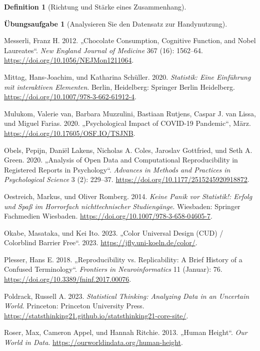 \documentclass[
  a4paper,
  DIV=11]{scrreprt}
\newlength{\cslhangindent}
\newenvironment{CSLReferences}[2] %
 {\begin{list}{}{%
  \setlength{\itemindent}{0pt}
  \setlength{\leftmargin}{0pt}
  \setlength{\parsep}{0pt}
  \ifodd #1
   \setlength{\leftmargin}{\cslhangindent}
   \setlength{\itemindent}{-1\cslhangindent}
  \fi
  \setlength{\itemsep}{#2\baselineskip}}}
 {\end{list}}
\theoremstyle{definition}
\newtheorem{exercise}{Übungsaufgabe}[chapter]
\theoremstyle{definition}
\theoremstyle{definition}
\newtheorem{definition}{Definition}[chapter]
\theoremstyle{remark}
\begin{document}
\begin{definition}[Richtung und Stärke eines
Zusammenhang]
\begin{exercise}[Analysieren Sie den Datensatz zur
Handynutzung]
\begin{CSLReferences}{1}{0}
Messerli, Franz H. 2012. {„Chocolate {Consumption}, {Cognitive
Function}, and {Nobel Laureates}``}. \emph{New England Journal of
Medicine} 367 (16): 1562--64.
\url{https://doi.org/10.1056/NEJMon1211064}.

Mittag, Hans-Joachim, und Katharina Schüller. 2020. \emph{Statistik:
Eine Einführung mit interaktiven Elementen}. Berlin, Heidelberg:
Springer Berlin Heidelberg.
\url{https://doi.org/10.1007/978-3-662-61912-4}.

Mulukom, Valerie van, Barbara Muzzulini, Bastiaan Rutjens, Caspar J. van
Lissa, und Miguel Farias. 2020. {„Psychological Impact of {COVID-19}
Pandemic``}, März. \url{https://doi.org/10.17605/OSF.IO/TSJNB}.

Obels, Pepijn, Daniël Lakens, Nicholas A. Coles, Jaroslav Gottfried, und
Seth A. Green. 2020. {„Analysis of {Open Data} and {Computational
Reproducibility} in {Registered Reports} in {Psychology}``}.
\emph{Advances in Methods and Practices in Psychological Science} 3 (2):
229--37. \url{https://doi.org/10.1177/2515245920918872}.

Oestreich, Markus, und Oliver Romberg. 2014. \emph{Keine Panik vor
Statistik!: Erfolg und Spaß im Horrorfach nichttechnischer
Studiengänge}. Wiesbaden: Springer Fachmedien Wiesbaden.
\url{https://doi.org/10.1007/978-3-658-04605-7}.

Okabe, Masataka, und Kei Ito. 2023. {„Color {Universal Design} ({CUD}) /
{Colorblind Barrier Free}``}. 2023.
\url{https://jfly.uni-koeln.de/color/}.

Plesser, Hans E. 2018. {„Reproducibility vs. {Replicability}: {A Brief
History} of a {Confused Terminology}``}. \emph{Frontiers in
Neuroinformatics} 11 (Januar): 76.
\url{https://doi.org/10.3389/fninf.2017.00076}.

Poldrack, Russell A. 2023. \emph{Statistical Thinking: Analyzing Data in
an Uncertain World}. Princeton: Princeton University Press.
\url{https://statsthinking21.github.io/statsthinking21-core-site/}.

Roser, Max, Cameron Appel, und Hannah Ritchie. 2013. {„Human Height``}.
\emph{Our World in Data}. \url{https://ourworldindata.org/human-height}.


\end{CSLReferences}
\end{exercise}
\end{definition}
\end{document}

